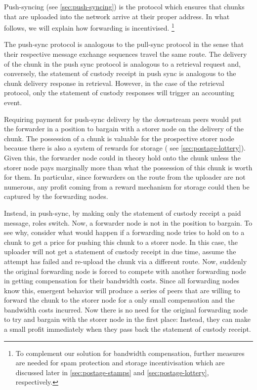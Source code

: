 Push-syncing (see \ref{sec:push-syncing}) is the protocol which ensures that chunks that are uploaded into the network arrive at their proper address. In what follows, we will explain how forwarding is incentivised.
%
%
\footnote{To complement our solution for bandwidth compensation, further measures are needed for spam protection and storage incentivisation which are discussed later in \ref{sec:postage-stamps} and \ref{sec:postage-lottery}, respectively.}

The push-sync protocol is analogous to the pull-sync protocol in the sense that their respective message exchange sequences travel the same route.
The delivery of the chunk in the push sync protocol is analogous to a retrieval request and, conversely, the statement of custody receipt in push sync is analogous to the chunk delivery response in retrieval. However, in the case of the retrieval protocol, only the statement of custody responses will trigger an accounting event.

Requiring payment for push-sync delivery by the downstream peers would put the forwarder in a position to bargain with a storer node on the delivery of the chunk. The possession of a chunk is valuable for the prospective storer node because there is also a system of rewards for storage ( see \ref{sec:postage-lottery}). Given this, the forwarder node could in theory hold onto the chunk unless the storer node pays marginally more than what the possession of this chunk is worth for them. In particular, since forwarders on the route from the uploader are not numerous, any profit coming from a reward mechanism for storage could then be captured by the forwarding nodes.

Instead, in push-sync, by making only the statement of custody receipt a paid message, roles switch. Now, a forwarder node is not in the position to bargain. To see why, consider what would happen if a forwarding node tries to hold on to a chunk to get a price for pushing this chunk to a storer node. In this case, the uploader will not get a statement of custody receipt in due time, assume the attempt has failed and re-upload the chunk via a different route. Now, suddenly the original forwarding node is forced to compete with another forwarding node in getting compensation for their bandwidth costs. Since all forwarding nodes know this, emergent behavior will produce a series of peers that are willing to forward the chunk to the storer node for a only small compensation and the bandwidth costs incurred. Now there is no need for the original forwarding node to try and bargain with the storer node in the first place: Instead, they can make a small profit immediately when they pass back the statement of custody receipt.


